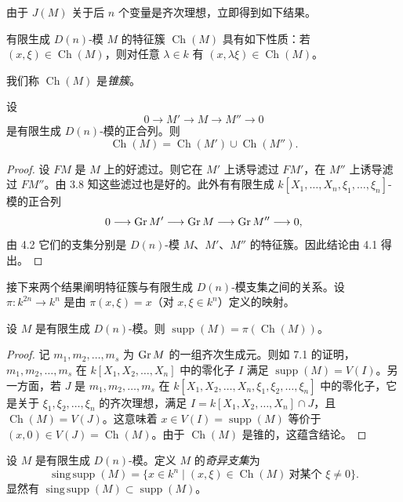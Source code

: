 由于 $J(M)$ 关于后 $n$ 个变量是齐次理想，立即得到如下结果。

\begin{lemma}
有限生成 $D(n)$-模 $M$ 的特征簇 $\operatorname{Ch}(M)$ 具有如下性质：若 $(x,\xi)\in\operatorname{Ch}(M)$，则对任意 $\lambda\in k$ 有 $(x,\lambda\xi)\in\operatorname{Ch}(M)$。
\end{lemma}

我们称 $\operatorname{Ch}(M)$ 是\emph{锥簇}。

\begin{proposition}
设
$$0\longrightarrow M'\longrightarrow M\longrightarrow M''\longrightarrow 0$$
是有限生成 $D(n)$-模的正合列。则
$$\operatorname{Ch}(M)=\operatorname{Ch}(M')\cup\operatorname{Ch}(M'').$$
\end{proposition}

\begin{proof}
设 $F M$ 是 $M$ 上的好滤过。则它在 $M'$ 上诱导滤过 $F M'$，在 $M''$ 上诱导滤过 $F M''$。由 3.8 知这些滤过也是好的。此外有有限生成 $k[X_1,\dots,X_n,\xi_1,\dots,\xi_n]$-模的正合列
$$0\longrightarrow\operatorname{Gr} M'\longrightarrow\operatorname{Gr} M\longrightarrow\operatorname{Gr} M''\longrightarrow 0,$$
由 4.2 它们的支集分别是 $D(n)$-模 $M$、$M'$、$M''$ 的特征簇。因此结论由 4.1 得出。
\end{proof}

接下来两个结果阐明特征簇与有限生成 $D(n)$-模支集之间的关系。设 $\pi:k^{2n}\longrightarrow k^n$ 是由 $\pi(x,\xi)=x$（对 $x,\xi\in k^n$）定义的映射。

\begin{proposition}
设 $M$ 是有限生成 $D(n)$-模。则 $\operatorname{supp}(M)=\pi(\operatorname{Ch}(M))$。
\end{proposition}

\begin{proof}
记 $m_1,m_2,\dots,m_s$ 为 $\operatorname{Gr} M$ 的一组齐次生成元。则如 7.1 的证明，$m_1,m_2,\dots,m_s$ 在 $k[X_1,X_2,\dots,X_n]$ 中的零化子 $I$ 满足 $\operatorname{supp}(M)=V(I)$。另一方面，若 $J$ 是 $m_1,m_2,\dots,m_s$ 在 $k[X_1,X_2,\dots,X_n,\xi_1,\xi_2,\dots,\xi_n]$ 中的零化子，它是关于 $\xi_1,\xi_2,\dots,\xi_n$ 的齐次理想，满足 $I=k[X_1,X_2,\dots,X_n]\cap J$，且 $\operatorname{Ch}(M)=V(J)$。这意味着 $x\in V(I)=\operatorname{supp}(M)$ 等价于 $(x,0)\in V(J)=\operatorname{Ch}(M)$。由于 $\operatorname{Ch}(M)$ 是锥的，这蕴含结论。
\end{proof}

设 $M$ 是有限生成 $D(n)$-模。定义 $M$ 的\emph{奇异支集}为
$$\operatorname{sing\,supp}(M)=\{x\in k^n\mid (x,\xi)\in\operatorname{Ch}(M)\ \text{对某个 }\xi\neq 0\}.$$
显然有 $\operatorname{sing\,supp}(M)\subset\operatorname{supp}(M)$。

